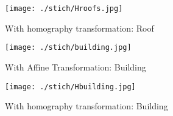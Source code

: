 \documentclass[10pt,letterpaper]{article}
\begin{document}
\begin{figure}[h]
\centering
\texttt{[image: ./stich/Hroofs.jpg]} 
\caption{\label{fig:dummy} With homography transformation: Roof}
\end{figure}

\begin{figure}[h]
\centering
\texttt{[image: ./stich/building.jpg]} 
\caption{\label{fig:dummy} With Affine Transformation: Building}
\end{figure}

\begin{figure}[h]
\centering
\texttt{[image: ./stich/Hbuilding.jpg]} 
\caption{\label{fig:dummy}  With homography transformation: Building}
\end{figure}
\newpage
\end{document}
